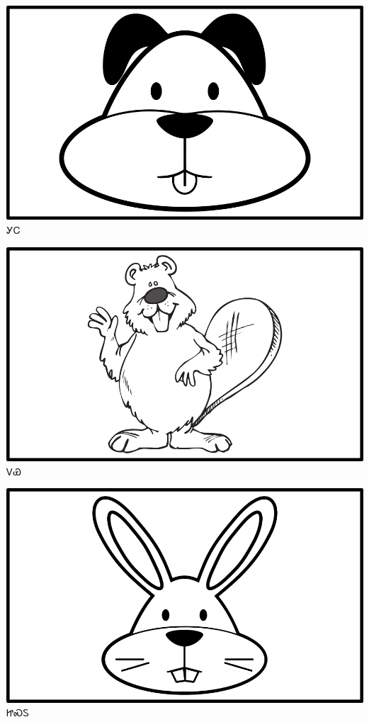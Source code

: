 \documentclass[avery5371]{flashcards}%
\begin{document}
\begin{flashcard}{
\includegraphics[width=0.95\columnwidth,height=.51\columnwidth,keepaspectratio]{../artwork/objects-animate/gihli}
}
\Huge ᎩᏟ
\end{flashcard}

\begin{flashcard}{
\includegraphics[width=0.95\columnwidth,height=.51\columnwidth,keepaspectratio]{../artwork/objects-animate/doya}
}
\Huge ᏙᏯ
\end{flashcard}

\begin{flashcard}{
\includegraphics[width=0.95\columnwidth,height=.51\columnwidth,keepaspectratio]{../artwork/objects-animate/jisdu}
}
\Huge ᏥᏍᏚ
\end{flashcard}
\end{document}
